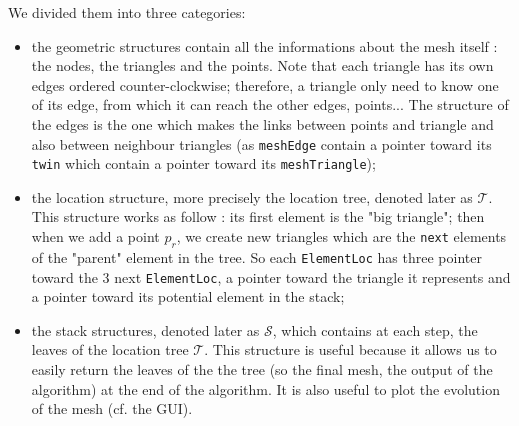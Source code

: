 We divided them into three categories: 
\begin{itemize}
\item the geometric structures contain all the informations about the mesh itself : the nodes, the triangles and the points. Note that each triangle has its own edges ordered counter-clockwise; therefore, a triangle only need to know one of its edge, from which it can reach the other edges, points... The structure of the edges is the one which makes the links between points and triangle and also between neighbour triangles (as \texttt{meshEdge} contain a pointer toward its \texttt{twin} which contain a pointer toward its \texttt{meshTriangle});
\item the location structure, more precisely the location tree, denoted later as $\mathcal{T}$. This structure works as follow : its first element is the "big triangle"; then when we add a point $p_r$, we create new triangles which are the \texttt{next} elements of the "parent" element in the tree. So each \texttt{ElementLoc} has three pointer toward the 3 next \texttt{ElementLoc}, a pointer toward the triangle it represents and a pointer toward its potential element in the stack;
\item  the stack structures, denoted later as $\mathcal{S}$, which contains at each step, the leaves of the location tree $\mathcal{T}$. This structure is useful because it allows us to easily return the leaves of the the tree (so the final mesh, the output of the algorithm) at the end of the algorithm. It is also useful to plot the evolution of the mesh (cf. the GUI). 
\end{itemize}
 

